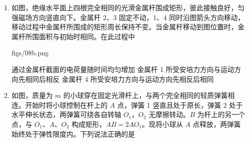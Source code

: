 \documentclass[\gkver]{gaokaozhenti}
\begin{document}
\begin{enumerate}
{$0=2mv\sin 30^\circ-2mv_{1}$

解得 $v_{1}=\frac{1}{2}v$

由于整个系统的能量守恒，设此时系统的电势能为 $E_{1}$，有

$E_{0}=E_{1}+\frac{1}{2}\cdot2mv^{2}+\frac{1}{2}\cdot2mv_{1}^{2}$

解得 $E_{0}-\frac{5}{4}mv^{2}$

故选 B。
}

\item
如图，绝缘水平面上四根完全相同的光滑金属杆围成矩形，彼此接触良好，匀强磁场方向竖直向下。金属杆 2、3 固定不动，1、4 同时沿图箭头方向移动，移动过程中金属杆所围成的矩形周长保持不变。当金属杆移动到图位置时，金属杆所围面积与初始时相同。在此过程中

{figs/08b.png}

{通过金属杆截面的电荷量随时间均匀增加}
{金属杆 1 所受安培力方向与运动方向先相同后相反}
{金属杆 4 所受安培力方向与运动方向先相反后相同}


\item
如图，质量为 $m$ 的小球穿在固定光滑杆上，与两个完全相同的轻质弹簧相连。开始时将小球控制在杆上的 $A$ 点，弹簧 1 竖直且处于原长，弹簧 2 处于水平伸长状态，两弹簧可绕各自转轴 $O_{1}$，$O_{2}$ 无摩擦转动。$B$ 为杆上的另一个点，与 $O_{1}$、$A$、$O_{2}$ 构成矩形，$AB=2AO_{1}$。现将小球从 $A$ 点释放，两弹簧始终处于弹性限度内。下列说法正确的是


\end{enumerate}
\end{document}
